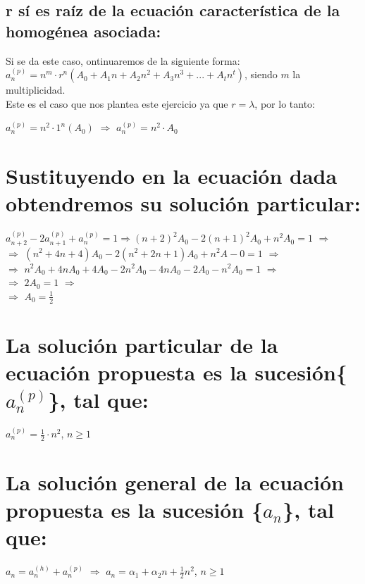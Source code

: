 \documentclass[12pt,letterpaper]{article}
\begin{document}
\subsection{r sí es raíz de la ecuación característica de la homogénea asociada:}
\noindent
Si se da este caso, ontinuaremos de la siguiente forma:\\
$a_n^{(p)}=n^m\cdot r^n(A_0+A_1n+A_2n^2+A_3n^3+...+A_tn^t)$, siendo $m$ la multiplicidad.\\
Este es el caso que nos plantea este ejercicio ya que $r=\lambda$, por lo tanto:\\
\begin{center}
	$a_n^{(p)}=n^2\cdot 1^n(A_0)$ $\Rightarrow$ $a_n^{(p)}=n^2\cdot A_0$
\end{center}

\section{Sustituyendo en la ecuación dada obtendremos su solución particular:}
\noindent
\begin{center}
	$a_{n+2}^{(p)}-2a_{n+1}^{(p)}+a_n^{(p)}=1 \Rightarrow (n+2)^2A_0-2(n+1)^2A_0+n^2A_0=1$ $\Rightarrow$\\
	$\Rightarrow$ $(n^2+4n+4)A_0-2(n^2+2n+1)A_0+n^2A-0=1$ $\Rightarrow$\\
	$\Rightarrow$ $n^2A_0+4nA_0+4A_0-2n^2A_0-4nA_0-2A_0-n^2A_0=1$ $\Rightarrow$\\
	$\Rightarrow$ $2A_0=1$ $\Rightarrow$\\
	$\Rightarrow$ $A_0=\frac{1}{2}$
\end{center}

\section{La solución particular de la ecuación propuesta es la sucesión\{$a_n^{(p)}$\}, tal que:}
\begin{center}
	$a_n^{(p)}=\frac{1}{2}\cdot n^2$, $n\geq 1$
\end{center}

\section{La solución general de la ecuación propuesta es la sucesión \{$a_n$\}, tal que:}
\begin{center}
	$a_n=a_n^{(h)}+a_n^{(p)}$ $\Longrightarrow$ $a_n=\alpha_1+\alpha_2n+\frac{1}{2}n^2$, $n\geq 1$
\end{center}
\end{document}
